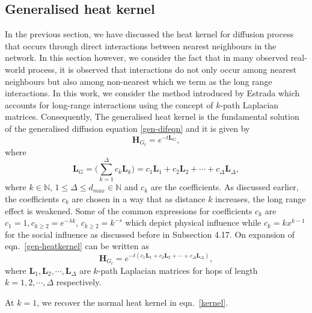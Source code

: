 \documentclass[10pt,a4paper]{article}
\theoremstyle{plain}
\theoremstyle{definition}
\begin{document}
        \subsection{Generalised heat kernel}
        In the previous section, we have discussed the heat kernel for diffusion process that occurs through direct interactions between nearest neighbours in the network. In this section however, we consider the fact that in many observed real-world process, it is observed that interactions do not only occur among nearest neighbours but also among non-nearest which we term as the long range interactions. In this work, we consider the method introduced by Estrada \citep{estrada2012path} which accounts for long-range interactions using the concept of $k$-path Laplacian matrices. Consequently, The generalised heat kernel is the fundamental solution of the generalised diffusion equation \ref{gen-difeqn} and it is given by 
        \begin{equation}
        \mathbf{H}_{G_t} = e^{-t \mathbf{L}_{G}},
        \end{equation}
        where
        \begin{equation}
        \mathbf{L}_{G} =  \Big(\sum_{k=1}^{\Delta}c_k\mathbf{L}_{k} \Big) = c_{1} \mathbf{L}_{1} + c_{2} \mathbf{L}_{2} + \cdots + c_{\Delta} \mathbf{L}_{\Delta}, 
        \label{gen-heatkernel}
        \end{equation}
        where $k\in \mathbb{N}$, $1 \leq \Delta \leq d_{max} \in \mathbb{N}$ and $c_k$ are the coefficients. As discussed earlier, 
        the coefficients $c_k$  are chosen in a way that as distance $k$ increases, the long range effect is weakened. Some of the common expressions for coefficients $c_k$ are $c_1 =1, c_{k\geq 2} = e^{-\lambda k}$, $ c_{k\geq 2} =k^{-s}$ which depict physical influence while $c_k = kx^{k-1}$ for the social influence as discussed before in Subsection 4.17.
        On expansion of eqn.~\ref{gen-heatkernel} can be written as 
        \begin{equation}
        \mathbf{H}_{G_t} = e^{-t(c_{1}\mathbf{L}_{1} + c_{2}\mathbf{L}_{2} + \cdots + c_{\Delta}\mathbf{L}_{\Delta})},
        \label{heatkernel-hsope}
        \end{equation}
        where $\mathbf{L}_1, \mathbf{L}_2, \cdots, \mathbf{L}_{\Delta}$ are  $k$-path Laplacian matrices for hops of length $k=1,2,\cdots, \Delta$ respectively. 
        
        At $k=1$, we recover the normal heat kernel in eqn.~\ref{kernel}.
        
\end{document}

